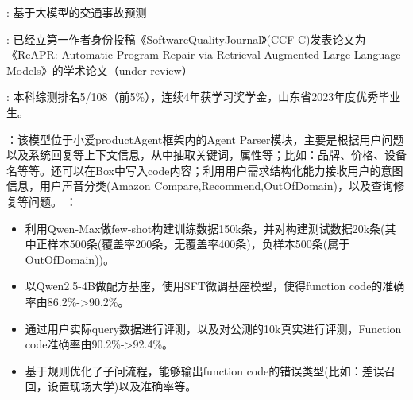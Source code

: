 \vspace{10pt}

\vspace{1ex}
\vspace{3pt}
\vspace{3pt}
 : 基于大模型的交通事故预测

 : 已经立第一作者身份投稿《SoftwareQualityJournal》(CCF-C)发表论文为《ReAPR: Automatic Program Repair via Retrieval-Augmented Large Language Models》的学术论文（under review）
\vspace{3pt}
\vspace{3pt}

 : 本科综测排名5/108（前5\%），连续4年获学习奖学金，山东省2023年度优秀毕业生。
\vspace{5pt}

\vspace{1ex}
\vspace{3pt}
\vspace{3pt}
\vspace{3pt}
：该模型位于小爱productAgent框架内的Agent Parser模块，主要是根据用户问题以及系统回复等上下文信息，从中抽取关键词，属性等；比如：品牌、价格、设备名等等。还可以在Box中写入code内容；利用用户需求结构化能力接收用户的意图信息，用户声音分类(Amazon Compare,Recommend,OutOfDomain)，以及查询修复等问题。
\vspace{3pt}
：
\begin{itemize}
  \item 利用Qwen-Max做few-shot构建训练数据150k条，并对构建测试数据20k条(其中正样本500条(覆盖率200条，无覆盖率400条)，负样本500条(属于OutOfDomain))。
  \item 以Qwen2.5-4B做配方基座，使用SFT微调基座模型，使得function code的准确率由86.2\%->90.2\%。
  \item 通过用户实际query数据进行评测，以及对公测的10k真实进行评测，Function code准确率由90.2\%->92.4\%。
  \item 基于规则优化了子问流程，能够输出function code的错误类型(比如：差误召回，设置现场大学)以及准确率等。
\end{itemize}

